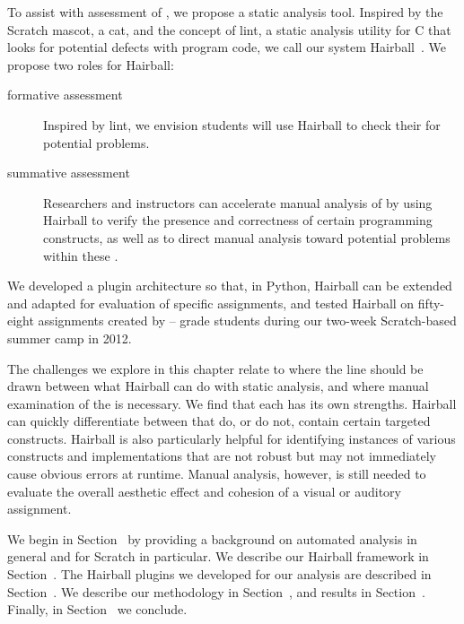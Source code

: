 To assist with assessment of , we propose a static analysis tool.
Inspired by the Scratch mascot, a cat, and the concept of lint, a static
analysis utility for C that looks for potential defects with program code, we
call our system Hairball~\cite{Johnson78lint}. We propose two roles for
Hairball:

\begin{description}
\item[formative assessment] Inspired by lint, we envision students will use
  Hairball to check their  for potential problems.
\item[summative assessment] Researchers and instructors can accelerate manual
  analysis of  by using Hairball to verify the presence and
  correctness of certain programming constructs, as well as to direct manual
  analysis toward potential problems within these .
\end{description}

We developed a plugin architecture so that, in Python, Hairball can be extended
and adapted for evaluation of specific assignments, and tested Hairball on
fifty-eight assignments created by -- grade students during our
two-week Scratch-based summer camp in 2012.

The challenges we explore in this chapter relate to where the line should be
drawn between what Hairball can do with static analysis, and where manual
examination of the \sprogram{} is necessary.  We find that each has its own
strengths.  Hairball can quickly differentiate between  that do, or
do not, contain certain targeted constructs. Hairball is also particularly
helpful for identifying instances of various constructs and implementations
that are not robust but may not immediately cause obvious errors at runtime.
Manual analysis, however, is still needed to evaluate the overall aesthetic
effect and cohesion of a visual or auditory assignment.

We begin in Section~ by providing a background on
automated analysis in general and for Scratch in particular. We describe our
Hairball framework in Section~. The Hairball plugins we
developed for our analysis are described in Section~. We
describe our methodology in Section~, and results in
Section~. Finally, in Section~ we
conclude.

